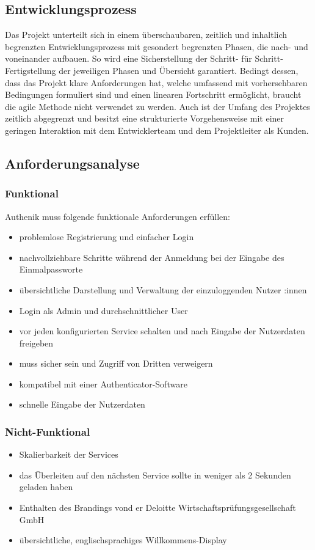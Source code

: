\subsection{Entwicklungsprozess}
\label{sec:Entwicklungsprozess}
Das Projekt unterteilt sich in einem überschaubaren, zeitlich und inhaltlich begrenzten Entwicklungsprozess 
mit gesondert begrenzten Phasen, die nach- und voneinander aufbauen. So wird eine Sicherstellung der Schritt- 
für Schritt-Fertigstellung der jeweiligen Phasen und Übersicht garantiert. Bedingt dessen, dass das Projekt klare Anforderungen 
hat, welche umfassend mit vorhersehbaren Bedingungen formuliert sind und einen linearen Fortschritt ermöglicht, braucht 
die agile Methode nicht verwendet zu werden. Auch ist der Umfang des Projektes zeitlich abgegrenzt und besitzt eine 
strukturierte Vorgehensweise mit einer geringen Interaktion mit dem Entwicklerteam und dem Projektleiter als Kunden.

\subsection{Anforderungsanalyse}
\label{sec:Anforderungsanalyse}

\subsubsection{Funktional}
\label{sec:Funktional}
Authenik muss folgende funktionale Anforderungen erfüllen:
\begin{itemize} [label=--]
	\item problemlose Registrierung und einfacher Login
	\item nachvollziehbare Schritte während der Anmeldung bei der Eingabe des Einmalpassworte
	\item übersichtliche Darstellung und Verwaltung der einzuloggenden Nutzer :innen
	\item Login als Admin und durchschnittlicher User
	\item vor jeden konfigurierten Service schalten und nach Eingabe der Nutzerdaten freigeben
	\item muss sicher sein und Zugriff von Dritten verweigern
	\item kompatibel mit einer Authenticator-Software
	\item schnelle Eingabe der Nutzerdaten
\end{itemize}

\subsubsection{Nicht-Funktional}
\label{sec:Nicht-Funktional}
\begin{itemize} [label=--]
	\item Skalierbarkeit der Services
	\item das Überleiten auf den nächsten Service sollte in weniger als 2 Sekunden geladen haben
	\item Enthalten des Brandings vond er Deloitte Wirtschaftsprüfungsgesellschaft GmbH
	\item übersichtliche, englischsprachiges Willkommens-Display
\end{itemize}
	